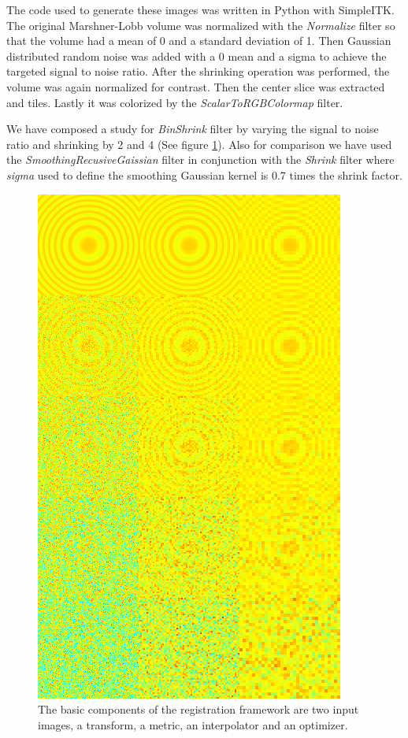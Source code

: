 \documentclass{InsightArticle}
\begin{document}
The code used to generate these images was written in Python with
SimpleITK. The original Marshner-Lobb volume was normalized with the 
\textit{Normalize} filter so that the volume had a mean
of 0 and a standard deviation of 1. Then Gaussian distributed random
noise was added with a 0 mean and a sigma to achieve the targeted
signal to noise ratio. After the shrinking operation was performed,
the volume was again normalized for contrast. Then the center slice
was extracted and tiles. Lastly it was colorized by the
\textit{ScalarToRGBColormap} filter\cite{Tustison2009}.

We have composed a study for \textit{BinShrink} filter by varying the
signal to noise ratio and shrinking by 2 and 4 (See figure
\ref{fig:BinShrinkComparison}). Also for comparison we have used the
\textit{SmoothingRecusiveGaissian} filter in conjunction with the
\textit{Shrink} filter where \textit{sigma} used to define the
smoothing Gaussian kernel is 0.7 times the shrink factor. 

\begin{figure}
  \centering
  \includegraphics[width=0.4\linewidth]{images/binshrink_hot.png}
  \caption[Registration Framework Components]{The basic components of the
    registration framework are two input images, a transform, a metric, an
    interpolator and an optimizer.}
  \label{fig:BinShrinkComparison}
\end{figure}
\end{document}
